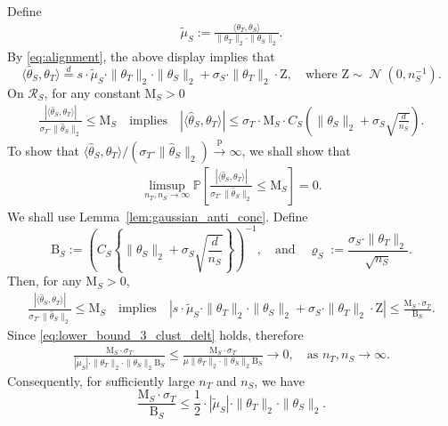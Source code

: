 \documentclass[10pt]{article}
\newcommand{\convp}{\xrightarrow{\mathrm{p}}}
\newcommand{\wh}{\widehat}
\newcommand{\wt}{\widetilde}
\DeclareMathOperator{\dnorm}{\mathcal N}
\newcommand{\trg}{T}
\newcommand{\thetaT}{\theta_{\trg}}
\newcommand{\nT}{n_{\trg}}
\newcommand{\sigmaT}{\sigma_{\trg}}
\newcommand{\src}{S}
\newcommand{\thetaS}{\theta_{\src}}
\newcommand{\nS}{n_{\src}}
\newcommand{\sigmaS}{\sigma_{\src}}
\begin{document}
Define 
\begin{align}
\label{eq:tilde_mu}
\wt \mu_\src:=\frac{\langle\thetaT,\thetaS\rangle}{\|\thetaT\|_2 \cdot \|\thetaS\|_2}.
\end{align}
By \eqref{eq:alignment}, the above display implies that 
\[
\langle \wh \theta_\src, \thetaT\rangle \overset{d}{=} s\cdot\wt \mu_\src\cdot \|\thetaT\|_2\cdot\|\thetaS\|_2+\sigmaS \cdot \|\thetaT\|_2\cdot \mathrm{Z}, \quad \mbox{where $\mathrm{Z} \sim \dnorm(0,\nS^{-1})$.}
\]
On $\mathcal R_\src$, for any constant $\mathrm M_\src>0$
\begin{align}
    \frac{|\langle \wh \theta_\src, \thetaT\rangle|}{\sigmaT \cdot \|\wh \theta_\src\|_2} \le \mathrm{M}_{\src} \quad \mbox{implies} \quad |\langle \wh \theta_\src, \thetaT\rangle| \le \sigmaT \cdot \mathrm{M}_{\src} \cdot C_\src\left(\|\theta_\src\|_2+\sigmaS\sqrt{\frac{d}{\nS}}\right).
\end{align}
To show that $\langle \wh \theta_\src, \thetaT\rangle/(\sigmaT \cdot \|\wh \theta_\src\|_2) \convp \infty$, we shall show that
\begin{align}
    \limsup_{\nT,\nS \to \infty}\mathbb P\left[\frac{|\langle \wh \theta_\src, \thetaT\rangle|}{\sigmaT \cdot \|\wh \theta_\src\|_2} \le \mathrm{M}_{\src}\right] = 0.
\end{align}
We shall use Lemma~\ref{lem:gaussian_anti_conc}. Define 
\[
\mathrm B_\src:=\left(C_\src\left\{\|\theta_\src\|_2+\sigmaS\sqrt{\frac{d}{\nS}}\right\}\right)^{-1}, \quad \mbox{and} \quad \varrho_\src:=\frac{\sigmaS \cdot \|\thetaT\|_2}{\sqrt{\nS}}.
\]
Then, for any $\mathrm M_\src>0$,
\begin{align}
    \frac{|\langle \wh \theta_\src, \thetaT\rangle|}{\sigmaT \cdot \|\wh \theta_\src\|_2} \le \mathrm{M}_{\src} \quad \mbox{implies} \quad \left|s\cdot\wt \mu_\src\cdot \|\thetaT\|_2\cdot\|\thetaS\|_2+\sigmaS \cdot \|\thetaT\|_2\cdot \mathrm{Z}\right| \le \frac{\mathrm M_\src \cdot \sigmaT}{\mathrm B_\src}.
\end{align}
Since \eqref{eq:lower_bound_3_clust_delt} holds, therefore 
\begin{align}
    \frac{\mathrm M_\src \cdot \sigmaT}{|\wt \mu_\src|\cdot \|\thetaT\|_2\cdot\|\thetaS\|_2\mathrm B_\src} \le \frac{\mathrm M_\src \cdot \sigmaT}{\mu \|\thetaT\|_2\cdot\|\thetaS\|_2\mathrm B_\src} \to 0, \quad \mbox{as $\nT,\nS \to \infty$.}
\end{align}
Consequently, for sufficiently large $\nT$ and $\nS$, we have
\[
\frac{\mathrm M_\src \cdot \sigmaT}{\mathrm B_\src} \le \frac{1}{2}\cdot|\wt \mu_\src|\cdot \|\thetaT\|_2\cdot\|\thetaS\|_2.
\]
\end{document}
